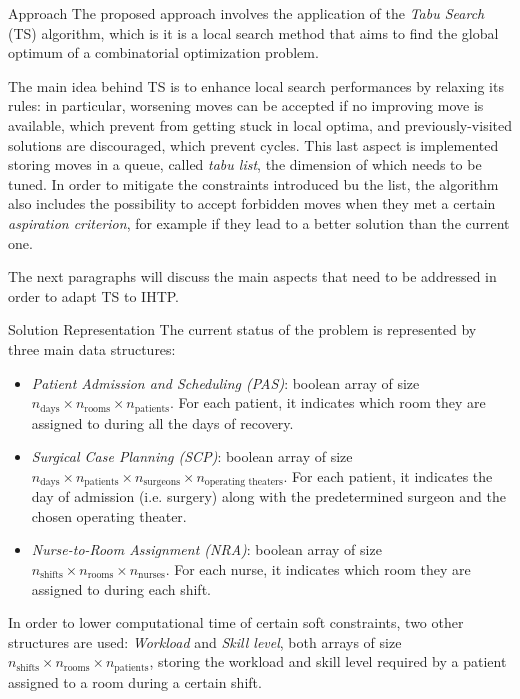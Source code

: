 \begin{section}
 {Approach}
 The proposed approach involves the application of the \textit{Tabu Search} (TS) algorithm, which is
 it is a local search method that aims to find the global optimum of a combinatorial optimization problem. \cite{ts}


 The main idea behind TS is to enhance local search performances by relaxing its rules: in particular,
 worsening moves can be accepted if no improving move is available, which prevent from getting stuck in local optima,
 and previously-visited solutions are discouraged, which prevent cycles.
 This last aspect is
 implemented storing moves in a queue, called \textit{tabu list}, the dimension of which needs to be tuned.
 In order to mitigate the constraints introduced bu the list, the algorithm also includes the possibility
 to accept forbidden moves when they met a certain \textit{aspiration criterion}, for example if they lead to
 a better solution than the current one.

 The next paragraphs will discuss the main aspects that need to be addressed in order to adapt TS to IHTP.



 \begin{subsection}
     {Solution Representation}
     The current status of the problem is represented by
     three main data structures:
     \begin{itemize}
         \item \textit{Patient Admission and Scheduling (PAS)}:
               boolean array of size $n_{\text{days}} \times n_{\text{rooms}} \times n_{\text{patients}}$.
               For each patient, it indicates which room they are assigned to during all the days of recovery.
         \item \textit{Surgical Case Planning (SCP)}:
               boolean array of size $n_{\text{days}} \times n_{\text{patients}} \times n_{\text{surgeons}} \times n_{\text{operating theaters}}$.
               For each patient, it indicates the day of admission (i.e. surgery) along with the predetermined surgeon and the chosen operating theater.
         \item \textit{Nurse-to-Room Assignment (NRA)}:
               boolean array of size $n_{\text{shifts}} \times n_{\text{rooms}} \times n_{\text{nurses}}$.
               For each nurse, it indicates which room they are assigned to during each shift.
     \end{itemize}
     In order to lower computational time of certain soft constraints, two other structures are used:
     \textit{Workload} and \textit{Skill level}, both arrays of size $n_{\text{shifts}} \times n_{\text{rooms}} \times n_{\text{patients}}$,
     storing the workload and skill level required by a patient assigned to a room during a certain shift.
 \end{subsection}


\end{section}
